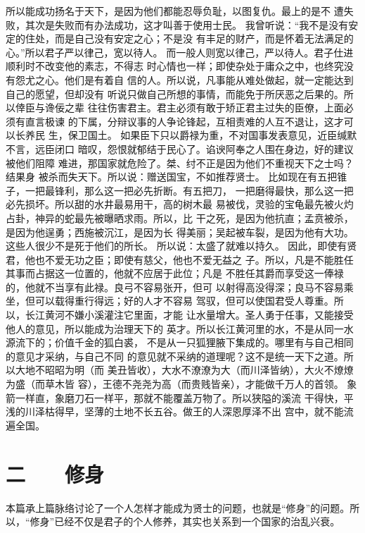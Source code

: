 \documentclass[12pt,UTF8]{ctexbook}
\begin{document}
所以能成功扬名于天下，是因为他们都能忍辱负耻，以图复仇。最上的是不 
遭失败，其次是失败而有办法成功，这才叫善于使用士民。 
我曾听说：“我不是没有安定的住处，而是自己没有安定之心；不是没 
有丰足的财产，而是怀着无法满足的心。”所以君子严以律己，宽以待人。 
而一般人则宽以律己，严以待人。君子仕进顺利时不改变他的素志，不得志 
时心情也一样；即使杂处于庸众之中，也终究没有怨尤之心。他们是有着自 
信的人。所以说，凡事能从难处做起，就一定能达到自己的愿望，但却没有 
听说只做自己所想的事情，而能免于所厌恶之后果的。所以倖臣与谗佞之辈 
往往伤害君主。君主必须有敢于矫正君主过失的臣僚，上面必须有直言极谏 
的下属，分辩议事的人争论锋起，互相责难的人互不退让，这才可以长养民 
生，保卫国土。 
如果臣下只以爵禄为重，不对国事发表意见，近臣缄默不言，远臣闭口 
暗叹，怨恨就郁结于民心了。谄谀阿奉之人围在身边，好的建议被他们阻障 
难进，那国家就危险了。桀、纣不正是因为他们不重视天下之士吗？结果身 
被杀而失天下。所以说：赠送国宝，不如推荐贤士。 
比如现在有五把锥子，一把最锋利，那么这一把必先折断。有五把刀， 
一把磨得最快，那么这一把必先损坏。所以甜的水井最易用干，高的树木最 
易被伐，灵验的宝龟最先被火灼占卦，神异的蛇最先被曝晒求雨。所以，比 
干之死，是因为他抗直；孟贲被杀，是因为他逞勇；西施被沉江，是因为长 
得美丽；吴起被车裂，是因为他有大功。这些人很少不是死于他们的所长。 
所以说：太盛了就难以持久。 
因此，即使有贤君，他也不爱无功之臣；即使有慈父，他也不爱无益之 
子。所以，凡是不能胜任其事而占据这一位置的，他就不应居于此位；凡是 
不胜任其爵而享受这一俸禄的，他就不当享有此禄。良弓不容易张开，但可 
以射得高没得深；良马不容易乘坐，但可以载得重行得远；好的人才不容易 
驾驭，但可以使国君受人尊重。所以，长江黄河不嫌小溪灌注它里面，才能 
让水量增大。圣人勇于任事，又能接受他人的意见，所以能成为治理天下的 
英才。所以长江黄河里的水，不是从同一水源流下的；价值千金的狐白裘， 
不是从一只狐狸腋下集成的。哪里有与自己相同的意见才采纳，与自己不同 
的意见就不采纳的道理呢？这不是统一天下之道。所以大地不昭昭为明（而 
美丑皆收），大水不潦潦为大（而川泽皆纳），大火不燎燎为盛（而草木皆 
容），王德不尧尧为高（而贵贱皆亲），才能做千万人的首领。 
象箭一样直，象磨刀石一样平，那就不能覆盖万物了。所以狭隘的溪流 
干得快，平浅的川泽枯得早，坚薄的土地不长五谷。做王的人深恩厚泽不出 
宫中，就不能流遍全国。 


\chapter{二　　修身}

本篇承上篇脉络讨论了一个人怎样才能成为贤士的问题，也就是“修身”的问题。所以，“修身”已经不仅是君子的个人修养，其实也关系到一个国家的治乱兴衰。
\end{document}

